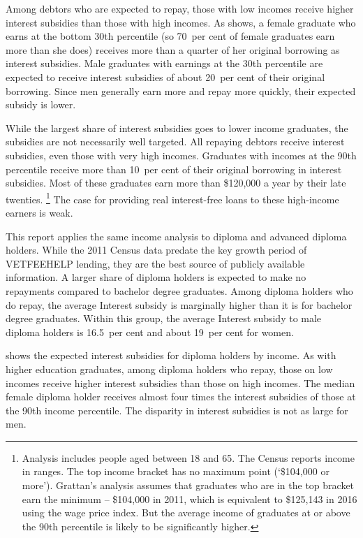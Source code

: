\documentclass[embargoed]{grattan}
\begin{document}
Among debtors who are expected to repay, those with low incomes receive higher interest subsidies than those with high incomes.
As  shows, a female graduate who earns at the bottom 30{th} percentile (so 70~per cent of female graduates earn more than she does) receives more than a quarter of her original borrowing as interest subsidies.
Male graduates with earnings at the 30{th} percentile are expected to receive interest subsidies of about 20~per cent of their original borrowing.
Since men generally earn more and repay more quickly, their expected subsidy is lower.

While the largest share of interest subsidies goes to lower income graduates, the subsidies are not necessarily well targeted.
All repaying debtors receive interest subsidies, even those with very high incomes.
Graduates with incomes at the 90{th} percentile receive more than 10~per cent of their original borrowing in interest subsidies.
Most of these graduates earn more than \$120,000 a year by their late twenties.%
\footnote{Analysis includes people aged between 18 and 65.
The Census reports income in ranges.
The top income bracket has no maximum point (`\$104,000 or more').
Grattan's analysis assumes that graduates who are in the top bracket earn the minimum -- \$104,000 in 2011, which is equivalent to \$125,143 in 2016 using the wage price index.
But the average income of graduates at or above the 90{th} percentile is likely to be significantly higher.} The case for providing real interest-free loans to these high-income earners is weak.

\protect\hypertarget{_Ref312571851}{}{}This report applies the same income analysis to diploma and advanced diploma holders.
While the 2011 Census data predate the key growth period of \gls{VETFEEHELP} lending, they are the best source of publicly available information.
A larger share of diploma holders is expected to make no repayments compared to bachelor degree graduates.
Among diploma holders who do repay, the average \gls{Interest subsidy} is marginally higher than it is for bachelor degree graduates.
Within this group, the average \gls{Interest subsidy} to male diploma holders is 16.5~per cent and about 19~per cent for women.

 shows the expected interest subsidies for diploma holders by income.
As with higher education graduates, among diploma holders who repay, those on low incomes receive higher interest subsidies than those on high incomes.
The median female diploma holder receives almost four times the interest subsidies of those at the 90{th} income percentile.
The disparity in interest subsidies is not as large for men.
\end{document}
